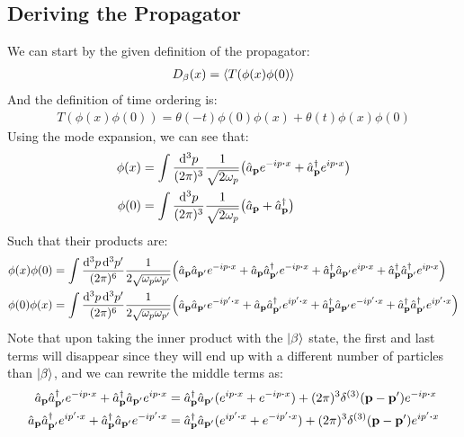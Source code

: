 \documentclass[12pt]{article}
\begin{document}
\subsection{Deriving the Propagator}
We can start by the given definition of the propagator:
\begin{align*}
    D_\beta(x)=\ev{T(\phi(x)\phi(0)}
\end{align*}
And the definition of time ordering is:
\begin{align*}
    T(\phi(x)\phi(0))=\theta(-t)\phi(0)\phi(x)+\theta(t)\phi(x)\phi(0)
\end{align*}
Using the mode expansion, we can see that:
\begin{align*}
    \phi(x)&=\int\frac{\dd[3]{p}}{(2\pi)^3}\frac1{\sqrt{2\omega_p}}
    \qty(\hat{a}_{\vb{p}}e^{-ip\vdot x}+\hat{a}^\dag_{\vb{p}}e^{ip\vdot x})\\
    \phi(0)&=\int\frac{\dd[3]{p}}{(2\pi)^3}\frac1{\sqrt{2\omega_p}}
    \qty(\hat{a}_{\vb{p}}+\hat{a}^\dag_{\vb{p}})
\end{align*}
Such that their products are:
\begin{align*}
    \phi(x)\phi(0)&=\int\frac{\dd[3]{p}\dd[3]{p'}}{(2\pi)^6}\frac{1}{2\sqrt{\omega_p\omega_{p'}}}
    \qty(\hat{a}_{\vb{p}}\hat{a}_{\vb{p}'}e^{-ip\vdot x}+\hat{a}_{\vb{p}}\hat{a}^\dag_{\vb{p}'}e^{-ip\vdot x}
    +\hat{a}^\dag_{\vb{p}}\hat{a}_{\vb{p}'}e^{ip\vdot x}+\hat{a}^\dag_{\vb{p}}\hat{a}^\dag_{\vb{p}'}e^{ip\vdot x})\\
    \phi(0)\phi(x)&=\int\frac{\dd[3]{p}\dd[3]{p'}}{(2\pi)^6}\frac{1}{2\sqrt{\omega_p\omega_{p'}}}
    \qty(\hat{a}_{\vb{p}}\hat{a}_{\vb{p}'}e^{-ip'\vdot x}+\hat{a}_{\vb{p}}\hat{a}^\dag_{\vb{p}'}e^{ip'\vdot x}
    +\hat{a}^\dag_{\vb{p}}\hat{a}_{\vb{p}'}e^{-ip'\vdot x}+\hat{a}^\dag_{\vb{p}}\hat{a}^\dag_{\vb{p}'}e^{ip'\vdot x})
\end{align*}
Note that upon taking the inner product with the $\ket{\beta}$ state, the first and last terms will disappear since they will end up with a different number of particles than $\ket{\beta}$, and we can rewrite the middle terms as:
\begin{align*}
    \hat{a}_{\vb{p}}\hat{a}^\dag_{\vb{p}'}e^{-ip\vdot x}+\hat{a}^\dag_{\vb{p}}\hat{a}_{\vb{p}'}e^{ip\vdot x}
    &=\hat{a}^\dag_{\vb{p}}\hat{a}_{\vb{p}'}(e^{ip\vdot x}+e^{-ip\vdot x})+(2\pi)^3\delta^{(3)}(\vb{p-p}')e^{-ip\vdot x}\\
    \hat{a}_{\vb{p}}\hat{a}^\dag_{\vb{p}'}e^{ip'\vdot x}+\hat{a}^\dag_{\vb{p}}\hat{a}_{\vb{p}'}e^{-ip'\vdot x}
    &=\hat{a}^\dag_{\vb{p}}\hat{a}_{\vb{p}'}(e^{ip'\vdot x}+e^{-ip'\vdot x})+(2\pi)^3\delta^{(3)}(\vb{p-p}')e^{ip'\vdot x}
\end{align*}
\end{document}
